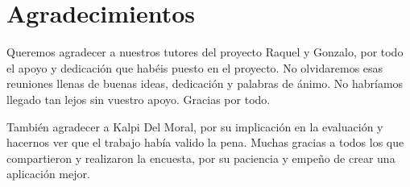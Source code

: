 
\chapter*{Agradecimientos}


Queremos agradecer a nuestros tutores del proyecto Raquel y Gonzalo, por todo el apoyo y dedicación que habéis puesto en el proyecto. No olvidaremos esas reuniones llenas de buenas ideas, dedicación y palabras de ánimo. No habríamos llegado tan lejos sin vuestro apoyo. Gracias por todo.

También agradecer a Kalpi Del Moral, por su implicación en la evaluación y hacernos ver que el trabajo había valido la pena. Muchas gracias a todos los que compartieron y realizaron la encuesta, por su paciencia y empeño de crear una aplicación mejor. 


